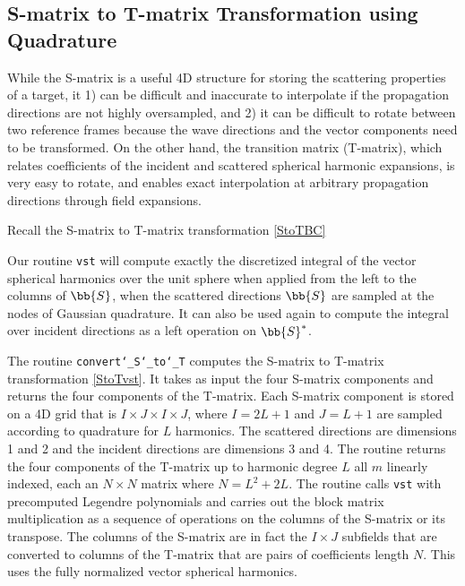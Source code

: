 \subsection{S-matrix to T-matrix Transformation using Quadrature}
\label{fastStoT}

While the S-matrix is a useful 4D structure for storing the scattering properties of a target, it 1) can be difficult and inaccurate to interpolate if the propagation directions are not highly oversampled, and 2) it can be difficult to rotate between two reference frames because the wave directions and the vector components need to be transformed. On the other hand, the transition matrix (T-matrix), which relates coefficients of the incident and scattered spherical harmonic expansions, is very easy to rotate, and enables exact interpolation at arbitrary propagation directions through field expansions.  

Recall the S-matrix to T-matrix transformation \eqref{StoTBC}

Our routine \texttt{vst} will compute exactly the discretized integral of the vector spherical harmonics over the unit sphere when applied from the left to the columns of $\bb{S}$, when the scattered directions $\bb{S}$ are sampled at the nodes of Gaussian quadrature. It can also be used again to compute the integral over incident directions as a left operation on $\bb{S}^*$.

The routine \texttt{convert\char`_S\char`_to\char`_T} computes the S-matrix to T-matrix transformation \eqref{StoTvst}. It takes as input the four S-matrix components and returns the four components of the T-matrix. Each S-matrix component is stored on a 4D grid that is $I \times J \times I \times J$, where $I = 2L+1$ and $J = L+1$ are sampled according to quadrature for $L$ harmonics. The scattered directions are dimensions 1 and 2 and the incident directions are dimensions 3 and 4. The routine returns the four components of the T-matrix up to harmonic degree $L$ all $m$ linearly indexed, each an $N \times N$ matrix where $N = L^2 + 2L$. The routine calls \texttt{vst} with precomputed Legendre polynomials and carries out the block matrix multiplication as a sequence of operations on the columns of the S-matrix or its transpose. The columns of the S-matrix are in fact the $I \times J$ subfields that are converted to columns of the T-matrix that are pairs of coefficients length $N$. This uses the fully normalized vector spherical harmonics.
\clearpage

